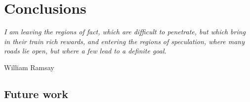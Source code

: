 \chapter{Conclusions}
\label{chapter:conclusions}

\epigraph{\textit{I am leaving the regions of fact, which are difficult to penetrate, but which bring in their train rich rewards, and entering the regions of speculation, where many roads lie open, but where a few lead to a definite goal.}}{William Ramsay}


\section{Future work}
